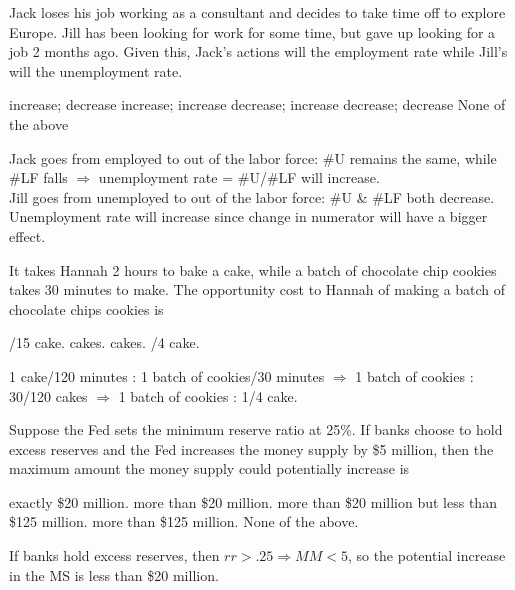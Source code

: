 \documentclass[addpoints,11pt]{exam}
\theoremstyle{definition}
\newcommand{\blank}[0]{\underline{\hspace{3cm}}}
\begin{document}
\begin{questions}
\question Jack loses his job working as a consultant and decides to take time off to explore Europe. Jill has been looking for work for some time, but gave up looking for a job 2 months ago. Given this, Jack's actions will \blank the employment rate while Jill's will \blank the unemployment rate.

\begin{choices}
\CorrectChoice increase; decrease
\choice increase; increase
\choice decrease; increase
\choice	decrease; decrease
\choice None of the above
\end{choices}

\begin{solution}
Jack goes from employed to out of the labor force: \#U remains the same, while \#LF falls $\Rightarrow$ unemployment rate = \#U/\#LF will increase. \\
Jill goes from unemployed to out of the labor force: \#U \& \#LF both decrease. Unemployment rate will increase since change in numerator will have a bigger effect.
\end{solution}

\question It takes Hannah 2 hours to bake a cake, while a batch of chocolate chip cookies takes 30 minutes to make. The opportunity cost to Hannah of making a batch of chocolate chips cookies is

\begin{choices}
/15 cake. 
 cakes.
 cakes.
/4 cake.
\end{choices}

\begin{solution}
1 cake/120 minutes : 1 batch of cookies/30 minutes $\Rightarrow$ 1 batch of cookies : 30/120 cakes $\Rightarrow$ 1 batch of cookies : 1/4 cake.
\end{solution}

\question Suppose the Fed sets the minimum reserve ratio at 25\%. If banks choose to hold excess reserves and the Fed increases the money supply by \$5 million, then the maximum amount the money supply could potentially increase is

\begin{choices}
\choice exactly \$20 million.
\choice more than \$20 million.
\choice more than \$20 million but less than \$125 million.
\choice more than \$125 million.
\CorrectChoice None of the above.
\end{choices}

\begin{solution}
If banks hold excess reserves, then $rr>.25 \Rightarrow MM<5$, so the potential increase in the MS is less than \$20 million.
\end{solution}


\end{questions}
\end{document}
